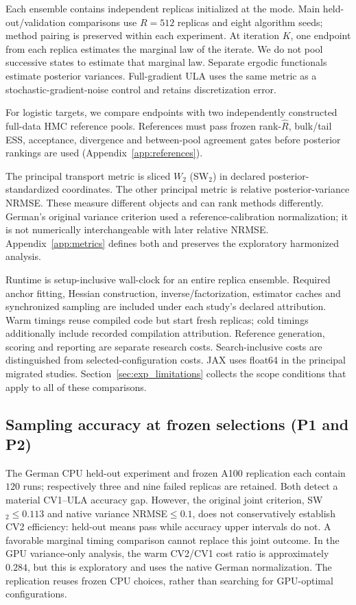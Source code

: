 Each ensemble contains independent replicas initialized at the mode. Main held-out/validation comparisons use $R=512$ replicas and eight algorithm seeds; method pairing is preserved within each experiment. At iteration $K$, one endpoint from each replica estimates the marginal law of the iterate. We do not pool successive states to estimate that marginal law. Separate ergodic functionals estimate posterior variances. Full-gradient ULA uses the same metric as a stochastic-gradient-noise control and retains discretization error.

For logistic targets, we compare endpoints with two independently constructed full-data HMC reference pools. References must pass frozen rank-$\widehat R$, bulk/tail ESS, acceptance, divergence and between-pool agreement gates before posterior rankings are used (Appendix~\ref{app:references}).

The principal transport metric is sliced $W_2$ (SW$_2$) in declared posterior-standardized coordinates. The other principal metric is relative posterior-variance NRMSE. These measure different objects and can rank methods differently. German's original variance criterion used a reference-calibration normalization; it is not numerically interchangeable with later relative NRMSE. Appendix~\ref{app:metrics} defines both and preserves the exploratory harmonized analysis.

Runtime is setup-inclusive wall-clock for an entire replica ensemble. Required anchor fitting, Hessian construction, inverse/factorization, estimator caches and synchronized sampling are included under each study's declared attribution. Warm timings reuse compiled code but start fresh replicas; cold timings additionally include recorded compilation attribution. Reference generation, scoring and reporting are separate research costs. Search-inclusive costs are distinguished from selected-configuration costs. JAX \citep{jax2018github} uses float64 in the principal migrated studies. Section~\ref{sec:exp_limitations} collects the scope conditions that apply to all of these comparisons.

\subsection{Sampling accuracy at frozen selections (P1 and P2)}\label{sec:exp_accuracy}
The German CPU held-out experiment and frozen A100 replication each contain $120$ runs; respectively three and nine failed replicas are retained. Both detect a material CV1--ULA accuracy gap. However, the original joint criterion, SW$_2\leq0.113$ and native variance NRMSE$\leq0.1$, does not conservatively establish CV2 efficiency: held-out means pass while accuracy upper intervals do not. A favorable marginal timing comparison cannot replace this joint outcome. In the GPU variance-only analysis, the warm CV2/CV1 cost ratio is approximately $0.284$, but this is exploratory and uses the native German normalization. The replication reuses frozen CPU choices, rather than searching for GPU-optimal configurations.

